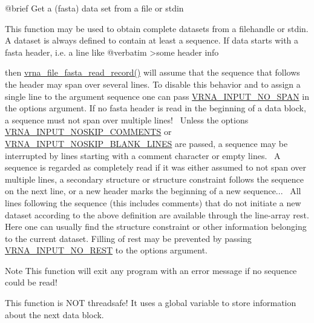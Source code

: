\begin{DoxyVerb}@brief  Get a (fasta) data set from a file or stdin

This function may be used to obtain complete datasets from a filehandle or stdin.
A dataset is always defined to contain at least a sequence. If data starts with a
fasta header, i.e. a line like
@verbatim >some header info \end{DoxyVerb}
 then \mbox{\hyperlink{group__file__formats_ga8cfb7e271efc9e1f34640acb85475639}{vrna\+\_\+file\+\_\+fasta\+\_\+read\+\_\+record()}} will assume that the sequence that follows the header may span over several lines. To disable this behavior and to assign a single line to the argument \textquotesingle{}sequence\textquotesingle{} one can pass \mbox{\hyperlink{group__utils_ga0de536599b881c787b0943a2671da476}{V\+R\+N\+A\+\_\+\+I\+N\+P\+U\+T\+\_\+\+N\+O\+\_\+\+S\+P\+AN}} in the \textquotesingle{}options\textquotesingle{} argument. If no fasta header is read in the beginning of a data block, a sequence must not span over multiple lines!~\newline
Unless the options \mbox{\hyperlink{group__utils_ga0f6311f11bed1842e3a527ab27b294c6}{V\+R\+N\+A\+\_\+\+I\+N\+P\+U\+T\+\_\+\+N\+O\+S\+K\+I\+P\+\_\+\+C\+O\+M\+M\+E\+N\+TS}} or \mbox{\hyperlink{group__utils_gab4db885222b3b69608310d7c7e63e286}{V\+R\+N\+A\+\_\+\+I\+N\+P\+U\+T\+\_\+\+N\+O\+S\+K\+I\+P\+\_\+\+B\+L\+A\+N\+K\+\_\+\+L\+I\+N\+ES}} are passed, a sequence may be interrupted by lines starting with a comment character or empty lines.~\newline
A sequence is regarded as completely read if it was either assumed to not span over multiple lines, a secondary structure or structure constraint follows the sequence on the next line, or a new header marks the beginning of a new sequence...~\newline
All lines following the sequence (this includes comments) that do not initiate a new dataset according to the above definition are available through the line-\/array \textquotesingle{}rest\textquotesingle{}. Here one can usually find the structure constraint or other information belonging to the current dataset. Filling of \textquotesingle{}rest\textquotesingle{} may be prevented by passing \mbox{\hyperlink{group__utils_ga7a2e8c50a0c7ce82e60da1016e1367fd}{V\+R\+N\+A\+\_\+\+I\+N\+P\+U\+T\+\_\+\+N\+O\+\_\+\+R\+E\+ST}} to the options argument.~\newline
 \begin{DoxyNote}{Note}
This function will exit any program with an error message if no sequence could be read! 

This function is N\+OT threadsafe! It uses a global variable to store information about the next data block.
\end{DoxyNote}
